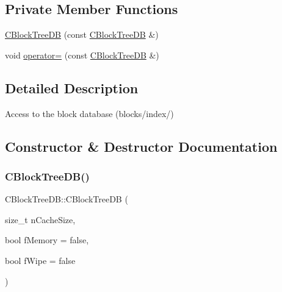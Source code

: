 \subsection*{Private Member Functions}
\begin{DoxyCompactItemize}
\item 
\mbox{\hyperlink{class_c_block_tree_d_b_a7e3d4632e9374e652bc008163bb9e2b1}{C\+Block\+Tree\+DB}} (const \mbox{\hyperlink{class_c_block_tree_d_b}{C\+Block\+Tree\+DB}} \&)
\item 
void \mbox{\hyperlink{class_c_block_tree_d_b_a93fa0b87d518a1142f3fbfe65ab07cd2}{operator=}} (const \mbox{\hyperlink{class_c_block_tree_d_b}{C\+Block\+Tree\+DB}} \&)
\end{DoxyCompactItemize}


\subsection{Detailed Description}
Access to the block database (blocks/index/) 

\subsection{Constructor \& Destructor Documentation}
\mbox{\label{class_c_block_tree_d_b_a52fd1b1dc02c2a4e977099e2c2c50424}} 
\subsubsection{\texorpdfstring{C\+Block\+Tree\+D\+B()}{CBlockTreeDB()}\hspace{0.1cm}{\footnotesize\ttfamily [1/2]}}
{\footnotesize\ttfamily C\+Block\+Tree\+D\+B\+::\+C\+Block\+Tree\+DB (\begin{DoxyParamCaption}\item[{size\+\_\+t}]{n\+Cache\+Size,  }\item[{bool}]{f\+Memory = {\ttfamily false},  }\item[{bool}]{f\+Wipe = {\ttfamily false} }\end{DoxyParamCaption})}

\mbox{\label{class_c_block_tree_d_b_a7e3d4632e9374e652bc008163bb9e2b1}} 
